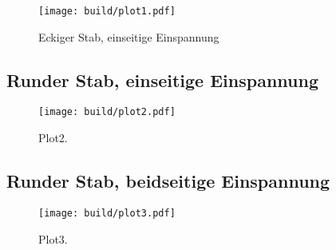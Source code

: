 \begin{figure}
  \centering
  \texttt{[image: build/plot1.pdf]}
  \caption{Eckiger Stab, einseitige Einspannung}
  \label{fig:plot1}
\end{figure}




\subsection{Runder Stab, einseitige Einspannung}
\begin{figure}
  \centering
  \texttt{[image: build/plot2.pdf]}
  \caption{Plot2.}
  \label{fig:plot2}
\end{figure}

\subsection{Runder Stab, beidseitige Einspannung}
\begin{figure}
  \centering
  \texttt{[image: build/plot3.pdf]}
  \caption{Plot3.}
  \label{fig:plot3}
\end{figure}
